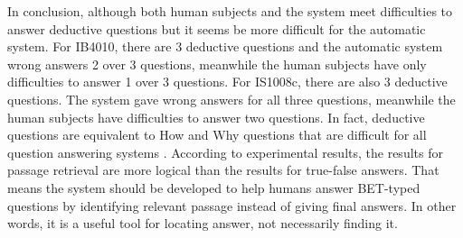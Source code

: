 \documentclass[10pt,a4paper]{article}
\numberwithin{algorithm}{section}  %
\begin{document}
In conclusion, although both human subjects and the system meet difficulties to answer deductive questions but it seems be more difficult for the automatic system. For IB4010, there are 3 deductive questions and the automatic system wrong answers 2 over 3 questions, meanwhile the human subjects have only difficulties to answer 1 over 3 questions. For IS1008c, there are also 3 deductive questions. The system gave wrong answers for all three questions, meanwhile the human subjects have difficulties to answer two questions. In fact, deductive questions are equivalent to How and Why questions that are difficult for all question answering systems \cite{prager2000qap, brill2002diq}.
According to experimental results, the results for passage retrieval are more logical than the results for true-false answers. That means the system should be developed to help humans answer BET-typed questions by identifying relevant passage instead of giving final answers.  In other words, it is a useful tool for locating answer, not necessarily finding it.









\pagebreak
\label{Bibliography}

 
\end{document}

